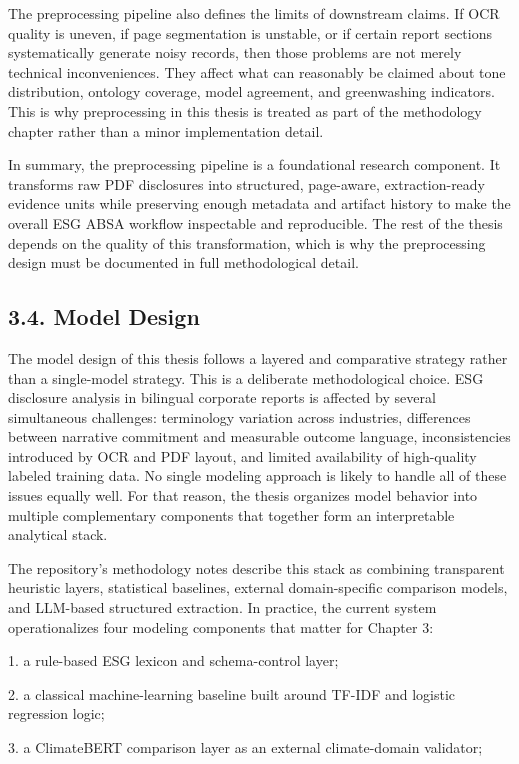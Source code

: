 \documentclass{article}
\begin{document}
The preprocessing pipeline also defines the limits of downstream claims. If OCR quality is uneven, if page segmentation is unstable, or if certain report sections systematically generate noisy records, then those problems are not merely technical inconveniences. They affect what can reasonably be claimed about tone distribution, ontology coverage, model agreement, and greenwashing indicators. This is why preprocessing in this thesis is treated as part of the methodology chapter rather than a minor implementation detail.

In summary, the preprocessing pipeline is a foundational research component. It transforms raw PDF disclosures into structured, page-aware, extraction-ready evidence units while preserving enough metadata and artifact history to make the overall ESG ABSA workflow inspectable and reproducible. The rest of the thesis depends on the quality of this transformation, which is why the preprocessing design must be documented in full methodological detail.
\subsection*{ 3.4. Model Design}

The model design of this thesis follows a layered and comparative strategy rather than a single-model strategy. This is a deliberate methodological choice. ESG disclosure analysis in bilingual corporate reports is affected by several simultaneous challenges: terminology variation across industries, differences between narrative commitment and measurable outcome language, inconsistencies introduced by OCR and PDF layout, and limited availability of high-quality labeled training data. No single modeling approach is likely to handle all of these issues equally well. For that reason, the thesis organizes model behavior into multiple complementary components that together form an interpretable analytical stack.

The repository’s methodology notes describe this stack as combining transparent heuristic layers, statistical baselines, external domain-specific comparison models, and LLM-based structured extraction. In practice, the current system operationalizes four modeling components that matter for Chapter 3:

1. a rule-based ESG lexicon and schema-control layer;

2. a classical machine-learning baseline built around TF-IDF and logistic regression logic;

3. a ClimateBERT comparison layer as an external climate-domain validator;
\end{document}
